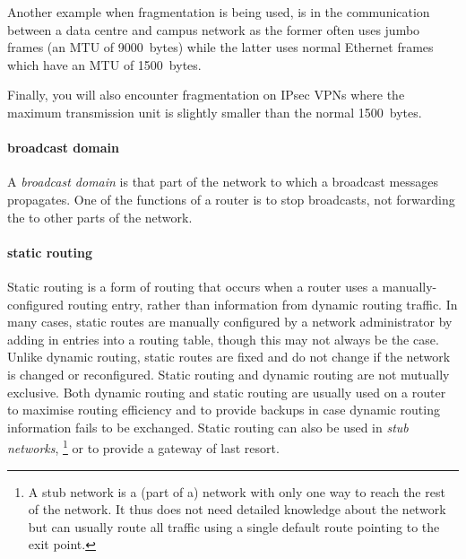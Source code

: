 Another example when fragmentation is being used, is in the communication between a data centre and campus network as the former often uses jumbo frames (an \acs{MTU} of 9000~bytes) while the latter uses normal Ethernet frames which have an \acs{MTU} of 1500~bytes.%

Finally, you will also encounter fragmentation on IPsec \aclp{VPN} where the maximum transmission unit is slightly smaller than the normal 1500~bytes.

\paragraph{broadcast domain}
A \emph{broadcast domain} is that part of the network to which a broadcast messages propagates.
One of the functions of a router is to stop broadcasts, not forwarding the to other parts of the network.

\paragraph{static routing}
Static routing is a form of routing that occurs when a router uses a manually-configured routing entry, rather than information from dynamic routing traffic.
In many cases, static routes are manually configured by a network administrator by adding in entries into a routing table, though this may not always be the case.
Unlike dynamic routing, static routes are fixed and do not change if the network is changed or reconfigured.
Static routing and dynamic routing are not mutually exclusive.
Both dynamic routing and static routing are usually used on a router to maximise routing efficiency and to provide backups in case dynamic routing information fails to be exchanged.
Static routing can also be used in \emph{stub networks},%
%
\footnote{%
A stub network is a (part of a) network with only one way to reach the rest of the network.
It thus does not need detailed knowledge about the network but can usually route all traffic using a single default route pointing to the exit point.
}
or to provide a gateway of last resort.


